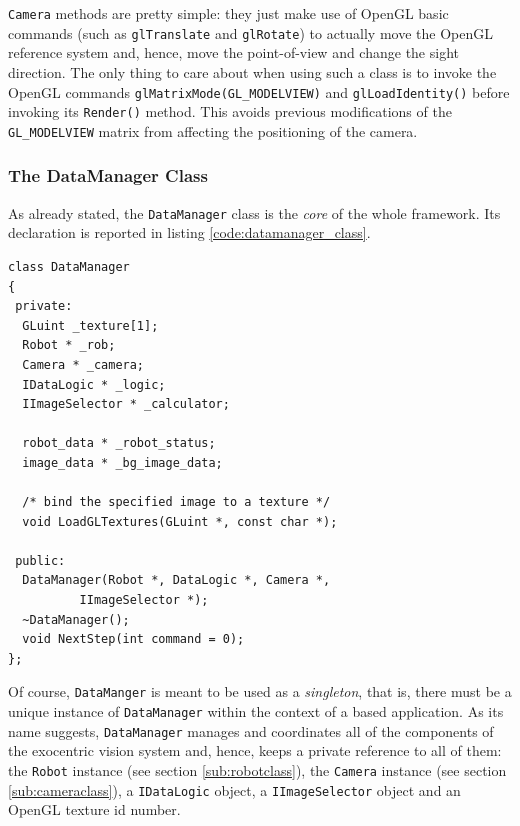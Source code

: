%
\texttt{Camera} methods are pretty simple: they just make 
use of OpenGL basic commands (such as \texttt{glTranslate} 
and \texttt{glRotate}) to actually move the OpenGL reference 
system and, hence, move the point-of-view and change the sight 
direction.
%
The only thing to care about when using such a class is 
to invoke the OpenGL commands \texttt{glMatrixMode(GL\_MODELVIEW)} 
and \texttt{glLoadIdentity()} before invoking its 
\texttt{Render()} method. This avoids previous modifications 
of the \texttt{GL\_MODELVIEW} matrix from affecting the 
positioning of the camera.
%

%
\subsubsection{The DataManager Class}
\label{sub:datamanager}

As already stated, the \texttt{DataManager} class is the \textit{core}
of the whole framework. Its declaration is reported in 
listing \ref{code:datamanager_class}.
%
\begin{lstlisting}[caption={\texttt{DataManager} class declaration}, label={code:datamanager_class}, frame=trBL]
class DataManager
{
 private:
  GLuint _texture[1];
  Robot * _rob;
  Camera * _camera;
  IDataLogic * _logic;
  IImageSelector * _calculator;

  robot_data * _robot_status;
  image_data * _bg_image_data;

  /* bind the specified image to a texture */
  void LoadGLTextures(GLuint *, const char *);

 public:
  DataManager(Robot *, DataLogic *, Camera *, 
	      IImageSelector *); 
  ~DataManager();
  void NextStep(int command = 0);
};
\end{lstlisting}
%
Of course, \texttt{DataManger} is meant to be used as a \textit{singleton}, 
that is, there must be a unique instance of \texttt{DataManager} 
within the context of a \framework{} based application.
%
As its name suggests, \texttt{DataManager} manages and coordinates 
all of the components of the exocentric vision system and, hence, 
keeps a private reference to all of them: 
the \texttt{Robot} instance (see section \ref{sub:robotclass}), the 
\texttt{Camera} instance (see section \ref{sub:cameraclass}),
a \texttt{IDataLogic} object, a \texttt{IImageSelector} 
object and an OpenGL texture id number.
%

